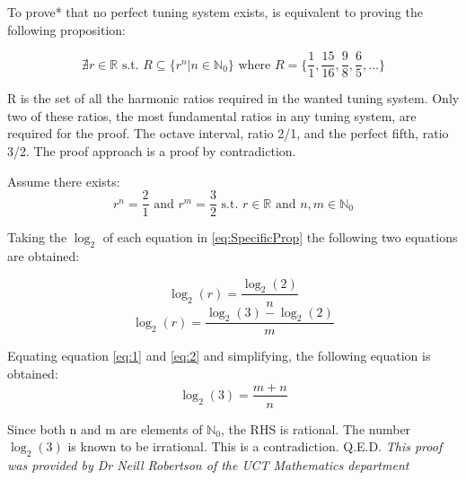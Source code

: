 
To prove* that no perfect tuning system exists, is equivalent to proving the
following proposition:

\begin{equation}\label{eq:GeneralProp}
	\nexists r \in \mathbb{R} \text{ s.t. }
	R \subseteq \{ r^n | n \in \mathbb{N}_0 \}
	\text{ where } R = \{ \frac{1}{1}, \frac{15}{16}, \frac{9}{8}, \frac{6}{5}, \dots \}
\end{equation}

R is the set of all the harmonic ratios required in the wanted tuning system. Only
two of these ratios, the most fundamental ratios in any tuning system, are
required for the proof. The octave interval, ratio 2/1, and the perfect fifth, ratio
3/2. The proof approach is a proof by contradiction.

Assume there exists:
\begin{equation}\label{eq:SpecificProp}
	r^n = \frac{2}{1} \text{ and } r^m = \frac{3}{2}
	\text{ s.t. }
	r \in \mathbb{R} \text{ and } n,m \in \mathbb{N}_0
\end{equation}

Taking the $\log_{2}$ of each equation in \ref{eq:SpecificProp} the following two
equations are obtained:

\begin{equation}\label{eq:1}
	\log_{2}(r) = \frac{\log_{2}(2)}{n}
\end{equation}
\begin{equation}\label{eq:2}
	\log_{2}(r) = \frac{\log_{2}(3) - \log_{2}(2)}{m}
\end{equation}

Equating equation \ref{eq:1} and \ref{eq:2} and simplifying, the following
equation is obtained:
\begin{equation}\label{eq:3}
	\log_{2}(3) = \frac{m+n}{n}
\end{equation}

Since both n and m are elements of $\mathbb{N}_0$, the RHS is rational.
The number $\log_{2}(3)$ is known to be irrational. This is a contradiction. Q.E.D.
\vfill
{\it *This proof was provided by Dr Neill Robertson of the UCT
Mathematics department}
